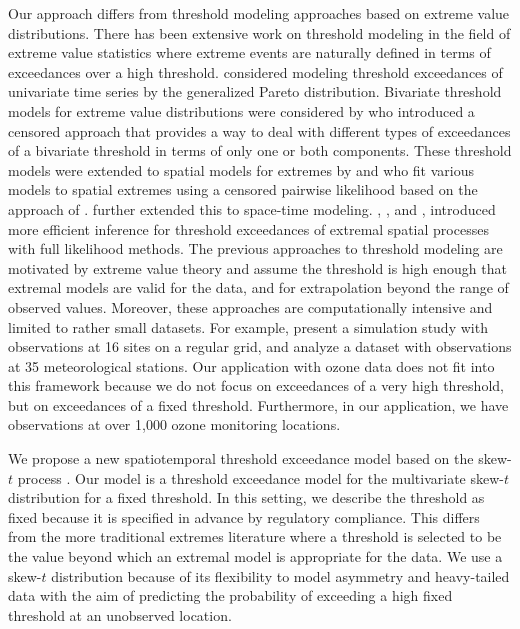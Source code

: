 \documentclass[useAMS,usenatbib,referee]{biom}
\begin{document}
Our approach differs from threshold modeling approaches based on extreme value distributions.
There has been extensive work on threshold modeling in the field of extreme value statistics where extreme events are naturally defined in terms of exceedances over a high threshold.
\citet{Davison1990} considered modeling threshold exceedances of univariate time series by the generalized Pareto distribution.
Bivariate threshold models for extreme value distributions were considered by \citet{Ledford1996} who introduced a censored approach that provides a way to deal with different types of exceedances of a bivariate threshold in terms of only one or both components.
These threshold models were extended to spatial models for extremes by \citet{Wadsworth2012} and \citet{Thibaud2013} who fit various models to spatial extremes using a censored pairwise likelihood \citep{Padoan2010} based on the approach of \citet{Ledford1996}.
\citet{Huser2014} further extended this to space-time modeling.
\citet{Thibaud2013a}, \citet{Engelke2014}, and \citet{Wadsworth2014}, introduced more efficient inference for threshold exceedances of extremal spatial processes with full likelihood methods.
The previous approaches to threshold modeling are motivated by extreme value theory and assume the threshold is high enough that extremal models are valid for the data, and for extrapolation beyond the range of observed values.
Moreover, these approaches are computationally intensive and limited to rather small datasets.
For example, \citet{Wadsworth2014} present a simulation study with observations at 16 sites on a regular grid, and \citet{Engelke2014} analyze a dataset with observations at 35 meteorological stations.
Our application with ozone data does not fit into this framework because we do not focus on exceedances of a very high threshold, but on exceedances of a fixed threshold.
Furthermore, in our application, we have observations at over 1,000 ozone monitoring locations.

We propose a new spatiotemporal threshold exceedance model based on the skew-$t$ process \citep{Padoan2011}.
Our model is a threshold exceedance model for the multivariate skew-$t$ distribution for a fixed threshold.
In this setting, we describe the threshold as fixed because it is specified in advance by regulatory compliance.
This differs from the more traditional extremes literature where a threshold is selected to be the value beyond which an extremal model is appropriate for the data.
We use a skew-$t$ distribution because of its flexibility to model asymmetry and heavy-tailed data with the aim of predicting the probability of exceeding a high fixed threshold at an unobserved location.
\end{document}
